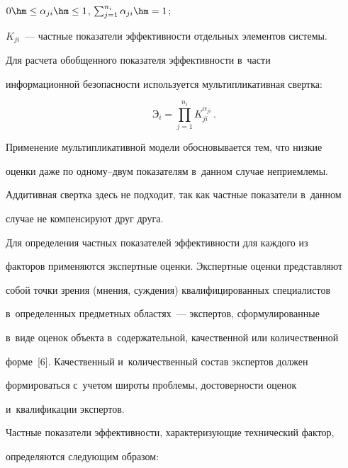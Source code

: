 $0\hm\leq \alpha_{ji}\hm\leq 1$, $\sum\nolimits_{j=1}^{n_i} \alpha_{ji}\hm=1$;

$K_{ji}$~--- частные показатели эффективности отдельных элементов системы.

  

  Для расчета обобщенного показателя эффективности в~части 

информационной безопасности используется мультипликативная свертка:

  \begin{equation}

  \mathrm{Э}_i=\prod\limits_{j=1}^{n_i} K_{ji}^{\alpha_{ji}}\,.

  \label{e3-z}

  \end{equation}

  

  Применение мультипликативной модели обосновывается тем, что низкие 

оценки даже по одному--двум показателям в~данном случае неприемлемы. 

Аддитивная свертка здесь не подходит, так как частные показатели в~данном 

случае не компенсируют друг друга.

  

  Для определения частных показателей эффективности для каждого из 

факторов применяются экспертные оценки. Экспертные оценки представляют 

собой точки зрения (мнения, суждения) квалифицированных специалистов 

в~определенных предметных областях~--- экспертов, сформулированные 

в~виде оценок объекта в~содержательной, качественной или количественной 

форме~[6]. Качественный и~количественный состав экспертов должен 

формироваться с~учетом широты проблемы, достоверности оценок 

и~квалификации экспертов.

  

  Частные показатели эффективности, характеризующие технический фактор, 

определяются следующим образом:

